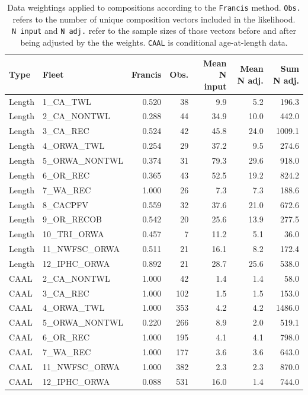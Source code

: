 \documentclass[
]{scrartcl}
\begin{document}
\begin{longtable}{llrrrrr}

\caption{\label{tbl-compweight}Data weightings applied to compositions
according to the \texttt{Francis} method. \texttt{Obs.} refers to the
number of unique composition vectors included in the likelihood.
\texttt{N\ input} and \texttt{N\ adj.} refer to the sample sizes of
those vectors before and after being adjusted by the the weights.
\texttt{CAAL} is conditional age-at-length data.}

\tabularnewline

\toprule
Type & Fleet & Francis & Obs. & Mean N input & Mean N adj. & Sum N adj. \\ 
\midrule\addlinespace[2.5pt]
Length & 1\_CA\_TWL & 0.520 & 38 & 9.9 & 5.2 & 196.3 \\ 
Length & 2\_CA\_NONTWL & 0.288 & 44 & 34.9 & 10.0 & 442.0 \\ 
Length & 3\_CA\_REC & 0.524 & 42 & 45.8 & 24.0 & 1009.1 \\ 
Length & 4\_ORWA\_TWL & 0.254 & 29 & 37.2 & 9.5 & 274.6 \\ 
Length & 5\_ORWA\_NONTWL & 0.374 & 31 & 79.3 & 29.6 & 918.0 \\ 
Length & 6\_OR\_REC & 0.365 & 43 & 52.5 & 19.2 & 824.2 \\ 
Length & 7\_WA\_REC & 1.000 & 26 & 7.3 & 7.3 & 188.6 \\ 
Length & 8\_CACPFV & 0.559 & 32 & 37.6 & 21.0 & 672.6 \\ 
Length & 9\_OR\_RECOB & 0.542 & 20 & 25.6 & 13.9 & 277.5 \\ 
Length & 10\_TRI\_ORWA & 0.457 & 7 & 11.2 & 5.1 & 36.0 \\ 
Length & 11\_NWFSC\_ORWA & 0.511 & 21 & 16.1 & 8.2 & 172.4 \\ 
Length & 12\_IPHC\_ORWA & 0.892 & 21 & 28.7 & 25.6 & 538.0 \\ 
CAAL & 2\_CA\_NONTWL & 1.000 & 42 & 1.4 & 1.4 & 58.0 \\ 
CAAL & 3\_CA\_REC & 1.000 & 102 & 1.5 & 1.5 & 153.0 \\ 
CAAL & 4\_ORWA\_TWL & 1.000 & 353 & 4.2 & 4.2 & 1486.0 \\ 
CAAL & 5\_ORWA\_NONTWL & 0.220 & 266 & 8.9 & 2.0 & 519.1 \\ 
CAAL & 6\_OR\_REC & 1.000 & 195 & 4.1 & 4.1 & 798.0 \\ 
CAAL & 7\_WA\_REC & 1.000 & 177 & 3.6 & 3.6 & 643.0 \\ 
CAAL & 11\_NWFSC\_ORWA & 1.000 & 382 & 2.3 & 2.3 & 870.0 \\ 
CAAL & 12\_IPHC\_ORWA & 0.088 & 531 & 16.0 & 1.4 & 744.0 \\ 
\bottomrule

\end{longtable}
\end{document}
